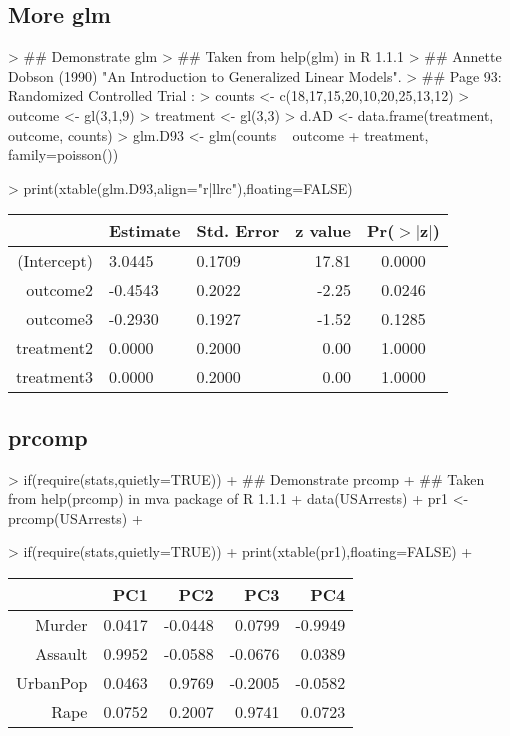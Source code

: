 \documentclass[letterpaper]{article}
\begin{document}
\subsection{More glm}
\begin{Schunk}
\begin{Sinput}
> ## Demonstrate glm
> ## Taken from help(glm) in R 1.1.1
> ## Annette Dobson (1990) "An Introduction to Generalized Linear Models".
> ## Page 93: Randomized Controlled Trial :
> counts <- c(18,17,15,20,10,20,25,13,12)
> outcome <- gl(3,1,9)
> treatment <- gl(3,3)
> d.AD <- data.frame(treatment, outcome, counts)
> glm.D93 <- glm(counts ~ outcome + treatment, family=poisson())
\end{Sinput}
\end{Schunk}
\begin{Schunk}
\begin{Sinput}
> print(xtable(glm.D93,align="r|llrc"),floating=FALSE)
\end{Sinput}
% latex table generated in R 3.1.1 by xtable 1.7-3 package
% 
\begin{tabular}{r|llrc}
  \hline
 & Estimate & Std. Error & z value & Pr($>$$|$z$|$) \\ 
  \hline
(Intercept) & 3.0445 & 0.1709 & 17.81 & 0.0000 \\ 
  outcome2 & -0.4543 & 0.2022 & -2.25 & 0.0246 \\ 
  outcome3 & -0.2930 & 0.1927 & -1.52 & 0.1285 \\ 
  treatment2 & 0.0000 & 0.2000 & 0.00 & 1.0000 \\ 
  treatment3 & 0.0000 & 0.2000 & 0.00 & 1.0000 \\ 
   \hline
\end{tabular}\end{Schunk}

\subsection{prcomp}
\begin{Schunk}
\begin{Sinput}
> if(require(stats,quietly=TRUE)) {
+   ## Demonstrate prcomp
+   ## Taken from help(prcomp) in mva package of R 1.1.1
+   data(USArrests)
+   pr1 <- prcomp(USArrests)
+ }
\end{Sinput}
\end{Schunk}
\begin{Schunk}
\begin{Sinput}
> if(require(stats,quietly=TRUE)) {
+   print(xtable(pr1),floating=FALSE)
+ }
\end{Sinput}
% latex table generated in R 3.1.1 by xtable 1.7-3 package
% 
\begin{tabular}{rrrrr}
  \hline
 & PC1 & PC2 & PC3 & PC4 \\ 
  \hline
Murder & 0.0417 & -0.0448 & 0.0799 & -0.9949 \\ 
  Assault & 0.9952 & -0.0588 & -0.0676 & 0.0389 \\ 
  UrbanPop & 0.0463 & 0.9769 & -0.2005 & -0.0582 \\ 
  Rape & 0.0752 & 0.2007 & 0.9741 & 0.0723 \\ 
   \hline
\end{tabular}\end{Schunk}
\end{document}
